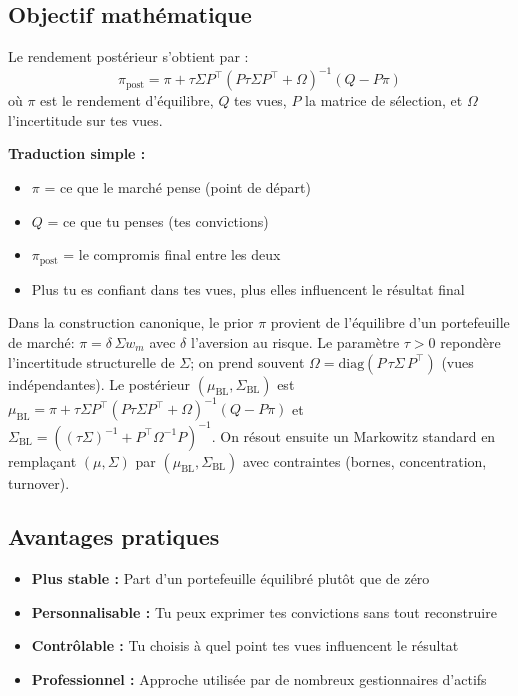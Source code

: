 \documentclass[11pt,a4paper]{article}
\begin{document}
\subsection{Objectif mathématique}
Le rendement postérieur s'obtient par :
\[\pi_{\text{post}} = \pi + \tau \Sigma P^\top (P \tau \Sigma P^\top + \Omega)^{-1} (Q - P \pi)\]
où \(\pi\) est le rendement d'équilibre, \(Q\) tes vues, \(P\) la matrice de sélection, et \(\Omega\) l'incertitude sur tes vues.

\textbf{Traduction simple :} 
\begin{itemize}
\item \(\pi\) = ce que le marché pense (point de départ)
\item \(Q\) = ce que tu penses (tes convictions)
\item \(\pi_{\text{post}}\) = le compromis final entre les deux
\item Plus tu es confiant dans tes vues, plus elles influencent le résultat final
\end{itemize}
\noindent Dans la construction canonique, le prior \(\pi\) provient de l'équilibre d'un portefeuille de marché: \(\pi = \delta \, \Sigma w_m\) avec \(\delta\) l'aversion au risque. Le paramètre \(\tau>0\) repondère l'incertitude structurelle de \(\Sigma\); on prend souvent \(\Omega=\text{diag}(P\, \tau\Sigma\, P^\top)\) (vues indépendantes). Le postérieur \((\mu_{\text{BL}},\Sigma_{\text{BL}})\) est \(\mu_{\text{BL}}=\pi+ \tau \Sigma P^\top (P\tau\Sigma P^\top+\Omega)^{-1}(Q-P\pi)\) et \(\Sigma_{\text{BL}} = ( (\tau\Sigma)^{-1} + P^\top \Omega^{-1} P )^{-1}\). On résout ensuite un Markowitz standard en remplaçant \((\mu,\Sigma)\) par \((\mu_{\text{BL}},\Sigma_{\text{BL}})\) avec contraintes (bornes, concentration, turnover).

\subsection{Avantages pratiques}
\begin{itemize}
\item \textbf{Plus stable :} Part d'un portefeuille équilibré plutôt que de zéro
\item \textbf{Personnalisable :} Tu peux exprimer tes convictions sans tout reconstruire
\item \textbf{Contrôlable :} Tu choisis à quel point tes vues influencent le résultat
\item \textbf{Professionnel :} Approche utilisée par de nombreux gestionnaires d'actifs
\end{itemize}
\end{document}
